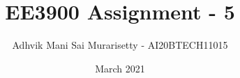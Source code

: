 \documentclass[journal,12pt,twocolumn]{IEEEtran}
\date{March 2021}
\DeclareMathOperator*{\Res}{Res}
\begin{document}
\newtheorem{theorem}{Theorem}[section]
\newtheorem{problem}{Problem}
\newtheorem{proposition}{Proposition}[section]
\newtheorem{lemma}{Lemma}[section]
\newtheorem{corollary}[theorem]{Corollary}
\newtheorem{example}{Example}[section]
\newtheorem{definition}[problem]{Definition}
\newcommand{\BEQA}{\begin{eqnarray}}
\newcommand{\EEQA}{\end{eqnarray}}
\newcommand{\define}{\stackrel{\triangle}{=}}

\raggedbottom
\setlength{\parindent}{0pt}
\providecommand{\mbf}{\mathbf}
\providecommand{\pr}[1]{\ensuremath{\Pr\left(#1\right)}}
\providecommand{\qfunc}[1]{\ensuremath{Q\left(#1\right)}}
\providecommand{\fn}[1]{\ensuremath{f\left({#1}\right)}}
\providecommand{\e}[1]{\ensuremath{E\left(#1\right)}}
\providecommand{\sbrak}[1]{\ensuremath{{}\left[#1\right]}}
\providecommand{\lsbrak}[1]{\ensuremath{{}\left[#1\right.}}
\providecommand{\rsbrak}[1]{\ensuremath{{}\left.#1\right]}}
\providecommand{\brak}[1]{\ensuremath{\left(#1\right)}}
\providecommand{\lbrak}[1]{\ensuremath{\left(#1\right.}}
\providecommand{\rbrak}[1]{\ensuremath{\left.#1\right)}}
\providecommand{\cbrak}[1]{\ensuremath{\left\{#1\right\}}}
\providecommand{\lcbrak}[1]{\ensuremath{\left\{#1\right.}}
\providecommand{\rcbrak}[1]{\ensuremath{\left.#1\right\}}}
\theoremstyle{remark}
\newtheorem{rem}{Remark}
\newcommand{\sgn}{\mathop{\mathrm{sgn}}}
\newcommand{\comb}[2]{{}^{#1}\mathrm{C}_{#2}}
\providecommand{\abs}[1]{\vert#1\vert}
\providecommand{\res}[1]{\Res\displaylimits_{#1}} 
\providecommand{\norm}[1]{\lVert#1\rVert}
\providecommand{\mtx}[1]{\mathbf{#1}}
\providecommand{\mean}[1]{E\sbrak{ #1 }}
\providecommand{\fourier}{\overset{\mathcal{F}}{ \rightleftharpoons}}
\providecommand{\system}{\overset{\mathcal{H}}{ \longleftrightarrow}}
\newcommand{\solution}{\noindent \textbf{Solution: }}
\newcommand{\cosec}{\,\text{cosec}\,}
\providecommand{\dec}[2]{\ensuremath{\overset{#1}{\underset{#2}{\gtrless}}}}
\newcommand{\myvec}[1]{\ensuremath{\begin{pmatrix}#1\end{pmatrix}}}
\newcommand{\mydet}[1]{\ensuremath{\begin{vmatrix}#1\end{vmatrix}}}
\makeatletter
{}
\makeatother
\let\StandardTheFigure\thefigure
\let\vec\mathbf
\vspace{3cm}
\title{EE3900 Assignment - 5}
\author{Adhvik Mani Sai Murarisetty - AI20BTECH11015}
\maketitle
\newpage
\bigskip
\renewcommand{\thetable}{\theenumi}
\end{document}
